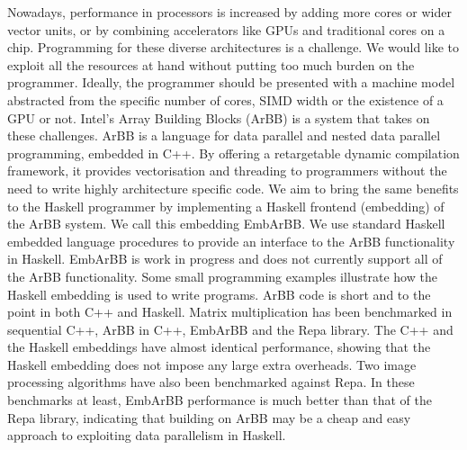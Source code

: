 
Nowadays, performance in processors is increased by adding more cores or
wider vector units, or by combining accelerators like GPUs and traditional cores on a chip. 
Programming for these diverse architectures is a challenge. We would 
like to exploit all the resources at hand without putting too much burden 
on the programmer. Ideally, the programmer should be presented with a machine 
model abstracted from the specific number of cores, SIMD width or the existence of 
a GPU or not. Intel's Array Building Blocks (ArBB) is a system that takes on these 
challenges. ArBB is a language for data parallel and nested data parallel 
programming, embedded in C++. By offering a retargetable dynamic compilation 
framework, it provides vectorisation and threading to programmers without 
the need to write highly architecture specific code. We aim to bring the 
same benefits to the Haskell programmer by implementing a Haskell frontend
(embedding) of the ArBB system. We call this embedding EmbArBB. 
We use standard Haskell embedded language procedures to provide an interface 
to the ArBB functionality in Haskell. EmbArBB is work in progress and 
does not currently support all of the ArBB functionality.
Some small programming examples illustrate how the Haskell 
embedding is used to write programs. ArBB code is short and to the point 
in both C++ and Haskell.
Matrix multiplication has been benchmarked in sequential C++, ArBB in C++, EmbArBB and the Repa library.
The C++ and the Haskell embeddings have almost identical performance, showing 
that the Haskell embedding does not impose any large extra overheads. 
Two image processing algorithms have also been benchmarked against Repa. In these benchmarks
at least, EmbArBB performance
is much better than that of the Repa library, indicating that building on ArBB may be a cheap and easy approach to exploiting data parallelism in Haskell.



